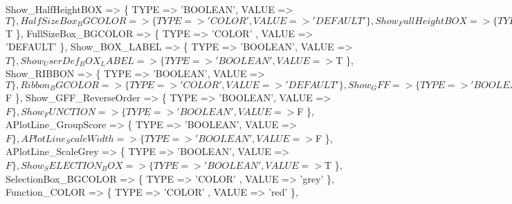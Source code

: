 \documentclass[11pt]{article}
\def\nwendcode{\endtrivlist \endgroup} %
\let\nwdocspar=\par                    %
\begin{document}
\nwenddocs{}\endmoddef
Show_HalfHeightBOX         => \{ TYPE => 'BOOLEAN', VALUE => $T     \},
HalfSizeBox_BGCOLOR        => \{ TYPE => 'COLOR'  , VALUE => 'DEFAULT' \},
Show_FullHeightBOX         => \{ TYPE => 'BOOLEAN', VALUE => $T     \},
FullSizeBox_BGCOLOR        => \{ TYPE => 'COLOR'  , VALUE => 'DEFAULT' \},
Show_BOX_LABEL             => \{ TYPE => 'BOOLEAN', VALUE => $T     \},
Show_UserDef_BOX_LABEL     => \{ TYPE => 'BOOLEAN', VALUE => $T     \},
Show_RIBBON                => \{ TYPE => 'BOOLEAN', VALUE => $T     \},
Ribbon_BGCOLOR             => \{ TYPE => 'COLOR'  , VALUE => 'DEFAULT' \},
Show_GFF                   => \{ TYPE => 'BOOLEAN', VALUE => $F     \},
Show_GFF_ReverseOrder      => \{ TYPE => 'BOOLEAN', VALUE => $F     \},
Show_FUNCTION              => \{ TYPE => 'BOOLEAN', VALUE => $F     \},
APlotLine_GroupScore       => \{ TYPE => 'BOOLEAN', VALUE => $F     \},
APlotLine_ScaleWidth       => \{ TYPE => 'BOOLEAN', VALUE => $F     \},
APlotLine_ScaleGrey        => \{ TYPE => 'BOOLEAN', VALUE => $F     \},
Show_SELECTION_BOX         => \{ TYPE => 'BOOLEAN', VALUE => $T     \},
SelectionBox_BGCOLOR       => \{ TYPE => 'COLOR'  , VALUE => 'grey' \},
Function_COLOR             => \{ TYPE => 'COLOR'  , VALUE => 'red'  \},
\nwendcode{}\nwdocspar

\begin{comment}
## ## 
## XTR (bin): Force those <features> for which XTR is switched ON
##   to be displayed in the third panel, if the Plot Option 
##   "Display_EXTRA-BOX" is switched ON.
## ## 
## Box (FHN): Define the box size (FHN) for <feature>.
## ##
## Line (NLRB): Draw lines across all panels for the <feature>.
## ##
## Join (bin): Switch ON to connect elements of one group with splice symbols.
## ##
## Arrw (bin): Swicth ON to display an arrow that shows the <feature>'s strand.
## ##
## Lbl (bin): Swicth ON to display the <feature>'s label
##   (if it's defined in the .gff file).
## ##
## Color (clr): Fill <Box> with this color.
## ##
## CLine (clr): Fill Line <Ribbons> with this color.
## ##
## Wdth (HND): You can choose among three predefined LineWidths.
## ##
## Layr : Layer where is drawed each feature.
##   You must pass an integer for feature ordering (1..n),
##   put 0 to print the feature always on top. 
\end{comment}
\end{document}

